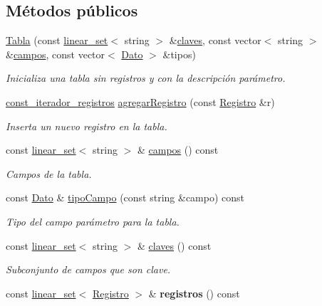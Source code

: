 \subsection*{Métodos públicos}
\begin{DoxyCompactItemize}
\item 
\hyperlink{classTabla_a5a7be353082561e06a877b2255c0ea5c}{Tabla} (const \hyperlink{classlinear__set}{linear\+\_\+set}$<$ string $>$ \&\hyperlink{classTabla_aaea7c833fd1f68742785482809c8667a}{claves}, const vector$<$ string $>$ \&\hyperlink{classTabla_a3436d172652646a83d8035d1c68b9073}{campos}, const vector$<$ \hyperlink{classDato}{Dato} $>$ \&tipos)
\begin{DoxyCompactList}\small\item\em Inicializa una tabla sin registros y con la descripción parámetro. \end{DoxyCompactList}\item 
\hyperlink{classTabla_1_1const__iterador__registros}{const\+\_\+iterador\+\_\+registros} \hyperlink{classTabla_a99345e41702e7e9984732c6f3672e386}{agregar\+Registro} (const \hyperlink{classRegistro}{Registro} \&r)
\begin{DoxyCompactList}\small\item\em Inserta un nuevo registro en la tabla. \end{DoxyCompactList}\item 
const \hyperlink{classlinear__set}{linear\+\_\+set}$<$ string $>$ \& \hyperlink{classTabla_a3436d172652646a83d8035d1c68b9073}{campos} () const 
\begin{DoxyCompactList}\small\item\em Campos de la tabla. \end{DoxyCompactList}\item 
const \hyperlink{classDato}{Dato} \& \hyperlink{classTabla_a256a50a84ffbf43b570c568bcaf5f52f}{tipo\+Campo} (const string \&campo) const 
\begin{DoxyCompactList}\small\item\em Tipo del campo parámetro para la tabla. \end{DoxyCompactList}\item 
const \hyperlink{classlinear__set}{linear\+\_\+set}$<$ string $>$ \& \hyperlink{classTabla_aaea7c833fd1f68742785482809c8667a}{claves} () const 
\begin{DoxyCompactList}\small\item\em Subconjunto de campos que son clave. \end{DoxyCompactList}\item 
\hypertarget{classTabla_a7bcdeb00d2fe040e454468d526cce66c}{const \hyperlink{classlinear__set}{linear\+\_\+set}$<$ \hyperlink{classRegistro}{Registro} $>$ \& {\bfseries registros} () const }\label{classTabla_a7bcdeb00d2fe040e454468d526cce66c}


\end{DoxyCompactItemize}
